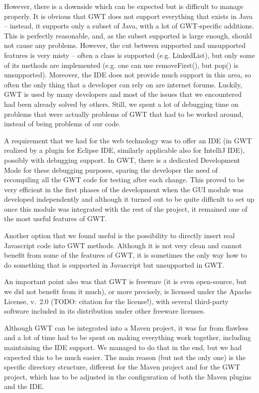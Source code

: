 However, there is a downside which can be expected but is difficult to manage properly. It is obvious that GWT does not support everything that exists in Java -- instead, it supports only a subset of Java, with a lot of GWT-specific additions. This is perfectly reasonable, and, as the subset supported is large enough, should not cause any problems. However, the cut between supported and unsupported features is very misty -- often a class is supported (e.g. LinkedList), but only some of its methods are implemented (e.g. one can use removeFirst(), but pop() is unsupported). Moreover, the IDE does not provide much support in this area, so often the only thing that a developer can rely on are internet forums. Luckily, GWT is used by many developers and most of the issues that we encountered had been already solved by others. Still, we spent a lot of debugging time on problems that were actually problems of GWT that had to be worked around, instead of being problems of our code.

A requirement that we had for the web technology was to offer an IDE (in GWT realized by a plugin for Eclipse IDE, similarly applicable also for IntelliJ IDE), possibly with debugging support. In GWT, there is a dedicated Development Mode for these debugging purposes, sparing the developer the need of recompiling all the GWT code for testing after each change. This proved to be very efficient in the first phases of the development when the GUI module was developed independently and although it turned out to be quite difficult to set up once this module was integrated with the rest of the project, it remained one of the most useful features of GWT.

Another option that we found useful is the possibility to directly insert real Javascript code into GWT methods. Although it is not very clean and cannot benefit from some of the features of GWT, it is sometimes the only way how to do something that is supported in Javascript but unsupported in GWT.

An important point also was that GWT is freeware (it is even open-source, but we did not benefit from it much), or more precisely, is licensed under the Apache License, v.~2.0 (TODO: citation for the license!), with several third-party software included in its distribution under other freeware licenses.

Although GWT can be integrated into a Maven project, it was far from flawless and a lot of time had to be spent on making everything work together, including maintaining the IDE support. We managed to do that in the end, but we had expected this to be much easier. The main reason (but not the only one) is the specific directory structure, different for the Maven project and for the GWT project, which has to be adjusted in the configuration of both the Maven plugins and the IDE.

